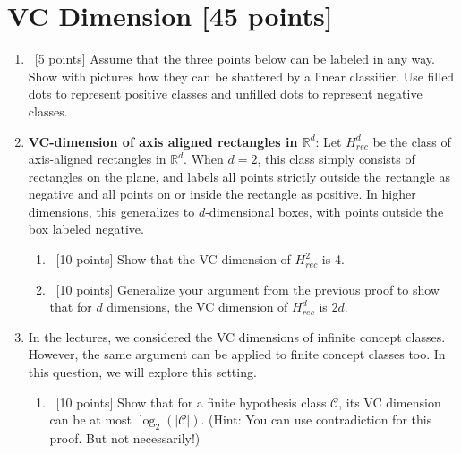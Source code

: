\section{VC Dimension [45 points]}
\label{sec:vc-dimension}
\begin{enumerate}
\item ~[5 points] Assume that the three points below can be labeled in any way.  Show with pictures how they can be shattered by a linear classifier.  Use filled dots to represent positive classes and unfilled dots to represent negative classes.

  
\item {\bf VC-dimension of axis aligned rectangles in $\mathbb{R}^d$}:
  Let $H^d_{rec}$ be the class of axis-aligned rectangles in
  $\mathbb{R}^d$. When $d=2$, this class simply consists of rectangles
  on the plane, and labels all points strictly outside the rectangle
  as negative and all points on or inside the rectangle as positive.
  In higher dimensions, this generalizes to $d$-dimensional boxes,
  with points outside the box labeled negative.

  \begin{enumerate}
  \item ~[10 points] Show that the VC dimension of $H^2_{rec}$ is 4.
  \item ~[10 points] Generalize your argument from the previous proof
    to show that for $d$ dimensions, the VC dimension of $H^d_{rec}$
    is $2d$.
  \end{enumerate}
  
\item In the lectures, we considered the VC dimensions of infinite
  concept classes. However, the same argument can be applied to finite
  concept classes too. In this question, we will explore this setting.

  \begin{enumerate}
  \item ~[10 points] Show that for a finite hypothesis class
    $\mathcal{C}$, its VC dimension can be at most
    $\log_2\left(|\mathcal{C}|\right)$. (Hint: You can use
    contradiction for this proof. But not necessarily!)


\end{enumerate}
\end{enumerate}
